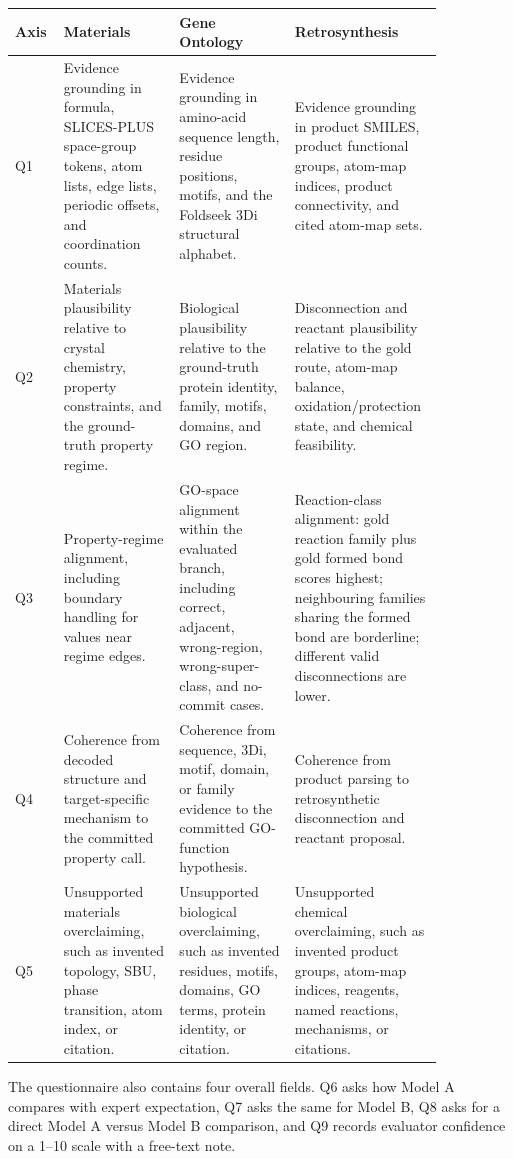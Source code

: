 \begin{appendices}
\begin{longtable}{P{0.10\linewidth}P{0.25\linewidth}P{0.25\linewidth}P{0.25\linewidth}}
\toprule
\textbf{Axis} & \textbf{Materials} & \textbf{Gene Ontology} & \textbf{Retrosynthesis} \\
\midrule
Q1 & Evidence grounding in formula, SLICES-PLUS space-group tokens, atom lists, edge lists, periodic offsets, and coordination counts. &
Evidence grounding in amino-acid sequence length, residue positions, motifs, and the Foldseek 3Di structural alphabet. &
Evidence grounding in product SMILES, product functional groups, atom-map indices, product connectivity, and cited atom-map sets. \\
Q2 & Materials plausibility relative to crystal chemistry, property constraints, and the ground-truth property regime. &
Biological plausibility relative to the ground-truth protein identity, family, motifs, domains, and GO region. &
Disconnection and reactant plausibility relative to the gold route, atom-map balance, oxidation/protection state, and chemical feasibility. \\
Q3 & Property-regime alignment, including boundary handling for values near regime edges. &
GO-space alignment within the evaluated branch, including correct, adjacent, wrong-region, wrong-super-class, and no-commit cases. &
Reaction-class alignment: gold reaction family plus gold formed bond scores highest; neighbouring families sharing the formed bond are borderline; different valid disconnections are lower. \\
Q4 & Coherence from decoded structure and target-specific mechanism to the committed property call. &
Coherence from sequence, 3Di, motif, domain, or family evidence to the committed GO-function hypothesis. &
Coherence from product parsing to retrosynthetic disconnection and reactant proposal. \\
Q5 & Unsupported materials overclaiming, such as invented topology, SBU, phase transition, atom index, or citation. &
Unsupported biological overclaiming, such as invented residues, motifs, domains, GO terms, protein identity, or citation. &
Unsupported chemical overclaiming, such as invented product groups, atom-map indices, reagents, named reactions, mechanisms, or citations. \\
\bottomrule
\end{longtable}

The questionnaire also contains four overall fields. Q6 asks how Model A compares
with expert expectation, Q7 asks the same for Model B, Q8 asks for a direct
Model A versus Model B comparison, and Q9 records evaluator confidence on a
1--10 scale with a free-text note.


\end{appendices}

